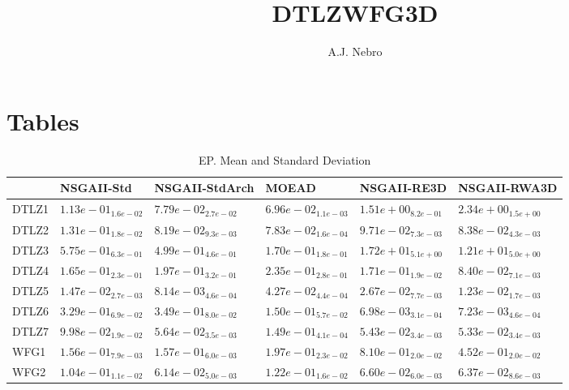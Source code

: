 \documentclass{article}
\title{DTLZWFG3D}
\author{A.J. Nebro}
\begin{document}
\maketitle
\section{Tables}

\begin{table}
\caption{EP. Mean and Standard Deviation}
\label{table: EP}
\centering
\begin{scriptsize}
\begin{tabular}{llllll}
\hline & NSGAII-Std & NSGAII-StdArch & MOEAD & NSGAII-RE3D &  NSGAII-RWA3D\\
\hline 
DTLZ1 & $  1.13e-01_{ 1.6e-02}$ & \cellcolor{gray25}$  7.79e-02_{ 2.7e-02}$ & \cellcolor{gray95}$  6.96e-02_{ 1.1e-03}$ & $  1.51e+00_{ 8.2e-01}$ & $  2.34e+00_{ 1.5e+00}$ \\
DTLZ2 & $  1.31e-01_{ 1.8e-02}$ & \cellcolor{gray25}$  8.19e-02_{ 9.3e-03}$ & \cellcolor{gray95}$  7.83e-02_{ 1.6e-04}$ & $  9.71e-02_{ 7.3e-03}$ & $  8.38e-02_{ 4.3e-03}$ \\
DTLZ3 & $  5.75e-01_{ 6.3e-01}$ & \cellcolor{gray25}$  4.99e-01_{ 4.6e-01}$ & \cellcolor{gray95}$  1.70e-01_{ 1.8e-01}$ & $  1.72e+01_{ 5.1e+00}$ & $  1.21e+01_{ 5.0e+00}$ \\
DTLZ4 & \cellcolor{gray25}$  1.65e-01_{ 2.3e-01}$ & $  1.97e-01_{ 3.2e-01}$ & $  2.35e-01_{ 2.8e-01}$ & $  1.71e-01_{ 1.9e-02}$ & \cellcolor{gray95}$  8.40e-02_{ 7.1e-03}$ \\
DTLZ5 & $  1.47e-02_{ 2.7e-03}$ & \cellcolor{gray95}$  8.14e-03_{ 4.6e-04}$ & $  4.27e-02_{ 4.4e-04}$ & $  2.67e-02_{ 7.7e-03}$ & \cellcolor{gray25}$  1.23e-02_{ 1.7e-03}$ \\
DTLZ6 & $  3.29e-01_{ 6.9e-02}$ & $  3.49e-01_{ 8.0e-02}$ & $  1.50e-01_{ 5.7e-02}$ & \cellcolor{gray95}$  6.98e-03_{ 3.1e-04}$ & \cellcolor{gray25}$  7.23e-03_{ 4.6e-04}$ \\
DTLZ7 & $  9.98e-02_{ 1.9e-02}$ & $  5.64e-02_{ 3.5e-03}$ & $  1.49e-01_{ 4.1e-04}$ & \cellcolor{gray25}$  5.43e-02_{ 3.4e-03}$ & \cellcolor{gray95}$  5.33e-02_{ 3.4e-03}$ \\
WFG1 & \cellcolor{gray95}$  1.56e-01_{ 7.9e-03}$ & \cellcolor{gray25}$  1.57e-01_{ 6.0e-03}$ & $  1.97e-01_{ 2.3e-02}$ & $  8.10e-01_{ 2.0e-02}$ & $  4.52e-01_{ 2.0e-02}$ \\
WFG2 & $  1.04e-01_{ 1.1e-02}$ & \cellcolor{gray95}$  6.14e-02_{ 5.0e-03}$ & $  1.22e-01_{ 1.6e-02}$ & $  6.60e-02_{ 6.0e-03}$ & \cellcolor{gray25}$  6.37e-02_{ 8.6e-03}$ \\

\end{tabular}
\end{scriptsize}
\end{table}
\end{document}
